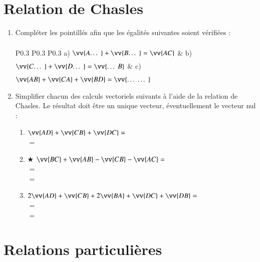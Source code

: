 \documentclass[oneside,12pt]{exam}          %
\begin{document}
\section{Relation de Chasles}
\begin{enumerate}[itemsep = 2mm]
	\item Compléter les pointillés afin que les égalités suivantes soient vérifiées :

	\renewcommand{\arraystretch}{1.75}
	\begin{tabular}{P{0.3\linewidth} P{0.3\linewidth} P{0.3\linewidth}}
		a) $\vv{A\ldots}+\vv{B\ldots}=\vv{AC}$ &
		b) $\vv{C\ldots}+\vv{D \ldots}=\vv{\ldots B}$ &
		c) $\vv{AB}+\vv{CA}+\vv{BD}=\vv{\ldots\ldots}$ 
	\end{tabular}
	
	\item Simplifier chacun des calculs vectoriels suivants à l'aide de la relation de Chasles. Le résultat doit être un unique vecteur, éventuellement le vecteur nul :
	\begin{enumerate}[itemsep = 3mm]
		\item $\vv{AD} + \vv{CB} + \vv{DC} = $ \dotfill \\[5pt]
		 $=$ \dotfill
		
		\item $\bigstar$ $\vv{BC} + \vv{AB} - \vv{CB} - \vv{AC} = $ \dotfill \\[5pt]
		 $=$ \dotfill \\[5pt]
		 $=$ \dotfill
		
		\item $2\vv{AD} + \vv{CB} + 2\vv{BA} + \vv{DC} + \vv{DB} = $ \dotfill \\[5pt]
		 $=$ \dotfill \\[5pt]
		 $=$ \dotfill
	\end{enumerate}
\end{enumerate}



\section{Relations particulières}
\end{document}

